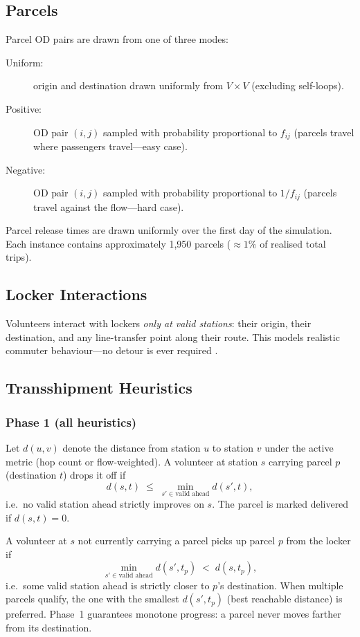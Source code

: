 \documentclass[11pt,a4paper]{article}
\begin{document}
\subsection{Parcels}

Parcel OD pairs are drawn from one of three modes:
\begin{description}
  \item[Uniform:] origin and destination drawn uniformly from $V\times V$
        (excluding self-loops).
  \item[Positive:] OD pair $(i,j)$ sampled with probability proportional to
        $f_{ij}$ (parcels travel where passengers travel---easy case).
  \item[Negative:] OD pair $(i,j)$ sampled with probability proportional to
        $1/f_{ij}$ (parcels travel against the flow---hard case).
\end{description}

Parcel release times are drawn uniformly over the first day of the simulation.
Each instance contains approximately 1{,}950 parcels ($\approx1\%$ of
realised total trips).

\subsection{Locker Interactions}

Volunteers interact with lockers \emph{only at valid stations}: their origin,
their destination, and any line-transfer point along their route. This models
realistic commuter behaviour---no detour is ever required
\cite{kafle2017crowdsource}.

\subsection{Transshipment Heuristics}

\subsubsection{Phase 1 (all heuristics)}

Let $d(u,v)$ denote the distance from station $u$ to station $v$ under the
active metric (hop count or flow-weighted). A volunteer at station $s$
carrying parcel $p$ (destination $t$) drops it off if
\[
  d(s,t) \;\leq\; \min_{s'\in \text{valid ahead}} d(s',t),
\]
i.e.\ no valid station ahead strictly improves on $s$. The parcel is marked
delivered if $d(s,t)=0$.

A volunteer at $s$ not currently carrying a parcel picks up parcel $p$ from
the locker if
\[
  \min_{s'\in \text{valid ahead}} d(s',t_p) \;<\; d(s,t_p),
\]
i.e.\ some valid station ahead is strictly closer to $p$'s destination. When
multiple parcels qualify, the one with the smallest $d(s',t_p)$ (best
reachable distance) is preferred. Phase~1 guarantees monotone progress: a
parcel never moves farther from its destination.
\end{document}
